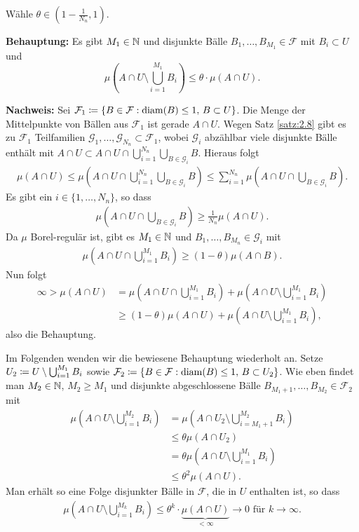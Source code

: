 \documentclass[a4paper,twoside,DIV15,BCOR12mm]{scrbook}
\DeclareMathOperator{\diam}{diam}
\begin{document}
\begin{beweis}
Wähle $\theta \in (1-\frac1{N_n}, 1)$.

\textbf{Behauptung:} Es gibt $M_1\in\mathbb{N}$ und disjunkte Bälle $B_1,\ldots,B_{M_1}\in\mathcal F$ mit $B_i \subset  U$ und 
$$\mu(A\cap U\setminus \bigcup_{i=1}^{M_1} B_i) \le \theta \cdot \mu(A\cap U).
$$


\textbf{Nachweis:} Sei $\mathcal F_1 \da \{B\in\mathcal F : \diam(B) \le 1,\, B\subset U\}$. Die Menge der Mittelpunkte von Bällen aus $\mathcal F_1$ ist gerade $A\cap U$. Wegen Satz \ref{satz:2.8} gibt es zu $\mathcal F_1$ Teilfamilien $\mathcal G_1,\ldots,\mathcal G_{N_n}\subset\mathcal F_1$, wobei $\mathcal G_i$ abzählbar viele disjunkte Bälle enthält mit $A\cap U\subset A\cap U \cap \bigcup_{i=1}^{N_n}\bigcup_{B\in\mathcal G_i}B$. Hieraus folgt
\begin{align*}
\mu(A\cap U)
\le \mu(A\cap U \cap \bigcup_{i=1}^{N_n} \bigcup_{B\in\mathcal G_i} B) 
\le \sum_{i=1}^{N_n}\mu(A\cap U \cap \bigcup_{B\in\mathcal G_i} B).
\end{align*}
Es gibt ein $i\in\{1,\ldots,N_n\}$, so dass
\begin{align*}
\mu(A\cap U \cap \bigcup_{B\in\mathcal G_i} B) \ge \frac1{N_n} \mu(A\cap U).
\end{align*}
Da $\mu$ Borel-regulär ist, gibt es $M_1\in\mathbb{N}$ und $B_1,\ldots,B_{M_n}\in \mathcal G_i$ mit
\begin{align*}
\mu(A\cap U \cap \bigcup_{i=1}^{M_1} B_i) 
\ge (1-\theta)\mu(A\cap B).
\end{align*}
Nun folgt
\begin{align*}
\infty > \mu(A\cap U)
&= \mu(A\cap U \cap \bigcup_{i=1}^{M_1} B_i) + \mu(A\cap U \setminus \bigcup_{i=1}^{M_1} B_i) \\
&\ge (1-\theta)\mu(A\cap U) + \mu(A\cap U\setminus \bigcup_{i=1}^{M_1} B_i),
\end{align*}
also die Behauptung.

Im Folgenden wenden wir die bewiesene Behauptung wiederholt an. 
Setze  $U_2 \da U\setminus\bigcup_{i=1}^{M_1} B_i$ sowie $\mathcal F_2\da\{B\in\mathcal F: \diam(B)\le 1,\, B\subset U_2\}$. Wie eben findet man $M_2\in\mathbb{N}$, $M_2\ge M_1$ und disjunkte abgeschlossene Bälle $B_{M_1+1},\ldots,B_{M_2}\in\mathcal F_2$ mit
\begin{align*}
\mu(A\cap U \setminus \bigcup_{i=1}^{M_2} B_i) 
&= \mu(A\cap  U_2 \setminus\bigcup_{i=M_1+1}^{M_2} B_i) \\
&\le \theta \mu(A\cap U_2) \\
&= \theta \mu(A\cap U \setminus \bigcup_{i=1}^{M_1} B_i)\\
&\le \theta^2 \mu(A\cap U).
\end{align*}
Man erhält so eine Folge disjunkter Bälle in $\mathcal F$, die in $U$ enthalten ist, so dass
\begin{align*}
\mu(A\cap U \setminus\bigcup_{i=1}^{M_k} B_i) \le \theta^k\cdot \underbrace{\mu(A\cap U)}_{<\infty} \to 0 \text{ für } k\to \infty.
\end{align*}
\end{beweis}
\end{document}
